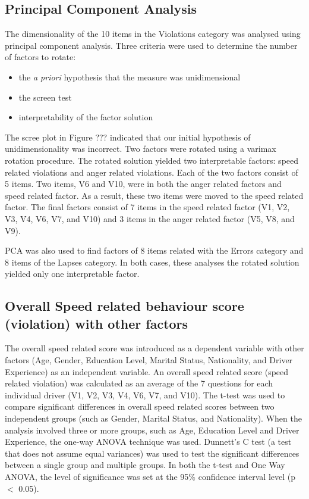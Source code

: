 \documentclass[preprint,12pt,a4paper,authoryear]{elsarticle}
\begin{document}
\subsection{Principal Component Analysis}
The dimensionality of the 10 items in the Violations category was analysed using principal component analysis.  Three criteria were used to determine the number of factors to rotate:
\begin{itemize}
\item{the \textit{a priori} hypothesis that the measure was unidimensional}
\item{the screen test}
\item{interpretability of the factor solution}
\end{itemize}

The scree plot in Figure ??? indicated that our initial hypothesis of unidimensionality was incorrect. Two factors were rotated using a varimax rotation procedure. The rotated solution yielded two interpretable factors: speed related violations and anger related violations. Each of the two factors consist of 5 items. Two items, V6 and V10, were in both the anger related factors and speed related factor. As a result, these two items were moved to the speed related factor. The final factors consist of 7 items in the speed related factor (V1, V2, V3, V4, V6, V7, and V10)  and 3 items in the anger related factor (V5, V8, and V9). 

PCA was also used to find factors of 8 items related with the Errors category and 8 items of the Lapses category. In both cases, these analyses the rotated solution yielded only one interpretable factor.

\subsection{Overall Speed related behaviour score (violation) with other factors}

The overall speed related score was introduced as a dependent variable with other factors (Age, Gender, Education Level, Marital Status, Nationality, and Driver Experience) as an independent variable. An overall speed related score (speed related violation) was calculated as an average of the 7 questions for each individual driver (V1, V2, V3, V4, V6, V7, and V10). The t-test was used to compare significant differences in overall speed related scores between two independent groups (such as Gender, Marital Status, and Nationality). When the analysis involved three or more groups, such as Age, Education Level and Driver Experience, the one-way ANOVA technique was used. Dunnett's C test (a test that does not assume equal variances) was used to test the significant differences between a single group and multiple groups. In both the t-test and One Way ANOVA, the level of significance was set at the 95\% confidence interval level (p$<$ 0.05). 
\end{document}
